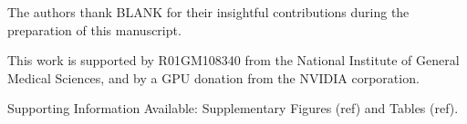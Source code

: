 \documentclass[journal=jmcmar,manuscript=article]{achemso}
\begin{document}
\begin{acknowledgement}


The authors thank BLANK for their insightful contributions during the preparation of this manuscript.

This work is supported by R01GM108340 from the National Institute of General Medical Sciences, and by a GPU donation from the NVIDIA corporation.

\end{acknowledgement}

\begin{suppinfo}

Supporting Information Available: Supplementary Figures (ref) and Tables (ref).
\end{suppinfo}


\end{document}
